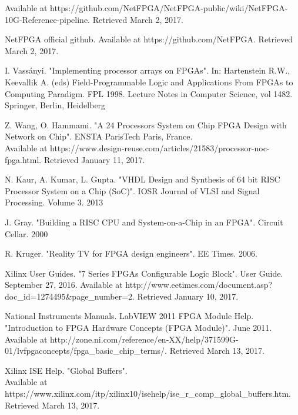 \documentclass{l4proj}
\begin{document}
\begin{enumerate}[label={[\arabic*]}]
Available at https://github.com/NetFPGA/NetFPGA-public/wiki/NetFPGA-10G-Reference-pipeline. Retrieved March 2, 2017.
\item NetFPGA official github.
Available at https://github.com/NetFPGA. Retrieved March 2, 2017.
\item I. Vassányi. "Implementing processor arrays on FPGAs". In: Hartenstein R.W., Keevallik A. (eds) Field-Programmable Logic and Applications From FPGAs to Computing Paradigm. FPL 1998. Lecture Notes in Computer Science, vol 1482. Springer, Berlin, Heidelberg
\item Z. Wang, O. Hammami. "A 24 Processors System on Chip FPGA Design with Network on Chip". ENSTA ParisTech Paris, France.\\
Available at https://www.design-reuse.com/articles/21583/processor-noc-fpga.html. Retrieved January 11, 2017.
\item N. Kaur, A. Kumar, L. Gupta. "VHDL Design and Synthesis of 64 bit RISC Processor System on a Chip (SoC)". IOSR Journal of VLSI and Signal Processing. Volume 3. 2013
\item J. Gray. "Building a RISC CPU and System-on-a-Chip in an FPGA". Circuit Cellar. 2000
\item R. Kruger. "Reality TV for FPGA design engineers". EE Times. 2006.
\item Xilinx User Guides. "7 Series FPGAs Configurable Logic Block". User Guide. September 27, 2016.
Available at http://www.eetimes.com/document.asp?doc\_id=1274495\&page\_number=2. Retrieved January 10, 2017.
\item National Instruments Manuals. LabVIEW 2011 FPGA Module Help. "Introduction to FPGA Hardware Concepts (FPGA Module)". June 2011.\\
Available at http://zone.ni.com/reference/en-XX/help/371599G-01/lvfpgaconcepts/fpga\_basic\_chip\_terms/. Retrieved March 13, 2017.
\item Xilinx ISE Help. "Global Buffers".\\
Available at https://www.xilinx.com/itp/xilinx10/isehelp/ise\_r\_comp\_global\_buffers.htm. Retrieved March 13, 2017.


\end{enumerate}
\end{document}

